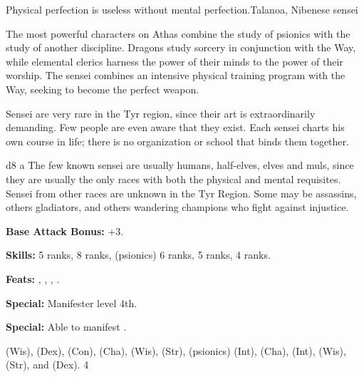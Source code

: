 {Physical perfection is useless without mental perfection.}{Talanoa, Nibenese sensei}
{The most powerful characters on Athas combine the study of psionics with the study of another discipline. Dragons study sorcery in conjunction with the Way, while elemental clerics harness the power of their minds to the power of their worship. The sensei combines an intensive physical training program with the Way, seeking to become the perfect weapon.

Sensei are very rare in the Tyr region, since their art is extraordinarily demanding. Few people are even aware that they exist. Each sensei charts his own course in life; there is no organization or school that binds them together.}
{d8}
{a}
{The few known sensei are usually humans, half-elves, elves and muls, since they are usually the only races with both the physical and mental requisites. Sensei from other races are unknown in the Tyr Region. Some may be assassins, others gladiators, and others wandering champions who fight against injustice.}
{
\textbf{Base Attack Bonus:} +3.

\textbf{Skills:}  5 ranks,  8 ranks,  (psionics) 6 ranks,  5 ranks,  4 ranks.

\textbf{Feats:} , , , .

\textbf{Special:} Manifester level 4th.

\textbf{Special:} Able to manifest .
}
{
 (Wis),  (Dex),  (Con),  (Cha),  (Wis),  (Str),  (psionics) (Int),  (Cha),  (Int),  (Wis),  (Str), and  (Dex).
}
{4}
